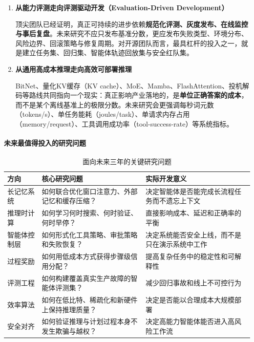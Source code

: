 \documentclass[12pt,a4paper]{article}
\begin{document}
\begin{enumerate}
    \item \textbf{从能力评测走向评测驱动开发（Evaluation-Driven Development）}
    
    顶尖团队已经证明，真正可持续的进步依赖\textbf{规范化评测、灰度发布、在线监控与事后复盘}。未来研究不应只发布基准分数，更应发布失败类型、环境分布、风险边界、回滚策略与修复周期。对开源团队而言，最具杠杆的投入之一，就是建立任务集、回归集、智能体轨迹回放集与安全红队集。
    
    \item \textbf{从通用高成本推理走向高效可部署推理}
    
    BitNet、量化KV缓存（KV cache）、MoE、Mamba、FlashAttention、投机解码等路线共同指向一个现实：真正影响产业落地的，是\textbf{单位正确答案的成本}，而不是某个离线基准上的极限分数。未来研究会更强调每秒词元数（tokens/s）、单任务能耗（joules/task）、单请求内存占用（memory/request）、工具调用成功率（tool-success-rate）等系统指标。
\end{enumerate}

\paragraph{未来最值得投入的研究问题}

\begin{table}[H]
\centering
\caption{面向未来三年的关键研究问题}
\begin{tabular}{p{3.2cm}p{5.0cm}p{4.6cm}}
\toprule
\textbf{方向} & \textbf{核心研究问题} & \textbf{实际开发意义} \\
\midrule
长记忆系统 & 如何联合优化窗口注意力、外部记忆和缓存压缩？ & 决定智能体是否能完成长流程任务而不遗忘上下文 \\
推理时计算 & 如何学习何时搜索、何时验证、何时早停？ & 直接影响成本、延迟和正确率的平衡 \\
智能体控制层 & 如何形式化工具策略、审批策略和失败恢复？ & 决定系统能否安全上线，而不是只在演示系统中工作 \\
过程奖励 & 如何用低成本方式获得步骤级信用分配？ & 提高复杂任务中的稳定性和可解释性 \\
评测工程 & 如何构建覆盖真实生产故障的智能体评测集？ & 减少回归事故和线上不可控行为 \\
效率算法 & 如何在低比特、稀疏化和新硬件上保持推理质量？ & 决定是否能以合理成本大规模部署 \\
安全对齐 & 如何验证推理与计划过程本身不发生欺骗与越权？ & 决定高能力智能体能否进入高风险工作流 \\
\bottomrule
\end{tabular}
\end{table}
\end{document}

